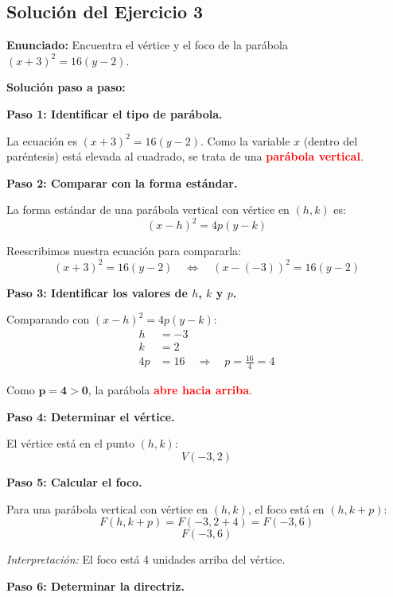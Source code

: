 \documentclass[12pt,a4paper]{article}
\begin{document}
	\newpage

	\subsection*{Solución del Ejercicio 3}

	\textbf{Enunciado:} Encuentra el vértice y el foco de la parábola \((x+3)^2=16(y-2)\).

	\bigskip

	\textbf{Solución paso a paso:}

	\bigskip

	\textbf{Paso 1: Identificar el tipo de parábola.}

	La ecuación es \((x+3)^2=16(y-2)\). Como la variable \(x\) (dentro del paréntesis) está elevada al cuadrado, se trata de una \textcolor{red}{\textbf{parábola vertical}}.

	\bigskip

	\textbf{Paso 2: Comparar con la forma estándar.}

	La forma estándar de una parábola vertical con vértice en \((h,k)\) es:
	\[
	(x-h)^2=4p(y-k)
	\]

	Reescribimos nuestra ecuación para compararla:
	\[
	(x+3)^2=16(y-2) \quad\Leftrightarrow\quad (x-(-3))^2=16(y-2)
	\]

	\textbf{Paso 3: Identificar los valores de \(h\), \(k\) y \(p\).}

	Comparando con \((x-h)^2=4p(y-k)\):
	\[
	\begin{aligned}
		h &= -3 \\
		k &= 2 \\
		4p &= 16 \quad\Rightarrow\quad p=\frac{16}{4}=4
	\end{aligned}
	\]

	Como \(\mathbf{p=4>0}\), la parábola \textcolor{red}{\textbf{abre hacia arriba}}.

	\bigskip

	\textbf{Paso 4: Determinar el vértice.}

	El vértice está en el punto \((h,k)\):
	\[
	\boxed{V(-3,2)}
	\]

	\textbf{Paso 5: Calcular el foco.}

	Para una parábola vertical con vértice en \((h,k)\), el foco está en \((h,k+p)\):
	\[
	F(h,k+p)=F(-3,2+4)=F(-3,6)
	\]
	\[
	\boxed{F(-3,6)}
	\]

	\emph{Interpretación:} El foco está 4 unidades arriba del vértice.

	\bigskip

	\textbf{Paso 6: Determinar la directriz.}
\end{document}
